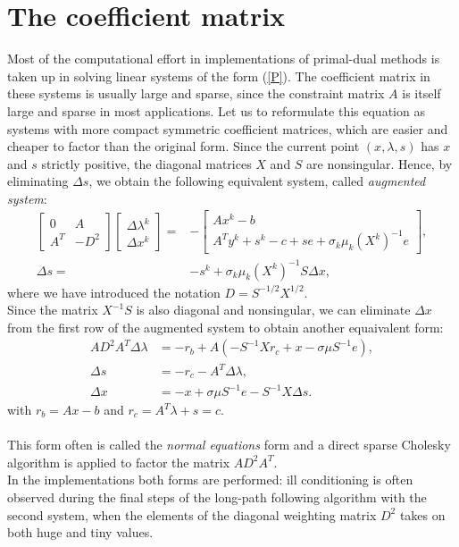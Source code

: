 \documentclass[a4paper,10 pt,titlepage,twoside]{book}
\theoremstyle{plain}
\theoremstyle{definition}
\theoremstyle{remark}
\begin{document}
\section*{The coefficient matrix}
Most of the computational effort in implementations of primal-dual methods is taken up in solving linear systems of the form (\ref{P}). The
coefficient matrix in these systems is usually large and sparse, since the constraint
matrix $A$ is itself large and sparse in most applications. Let us to reformulate
this equation as systems with more compact symmetric coefficient matrices, which
are easier and cheaper to factor than the original form. Since the current point $(x, \lambda, s)$ has $x$ and $s$ strictly
positive, the diagonal matrices $X$ and $S$ are nonsingular. Hence, by eliminating $\Delta s$, we obtain the following equivalent system, called \textit{augmented system}:
\begin{align*}
\begin{bmatrix}
0&A\\A^{T}&-D^{2}
\end{bmatrix}\begin{bmatrix}
\Delta\lambda^{k} \\\Delta x^{k}
\end{bmatrix}=&-\begin{bmatrix}
Ax^{k}-b\\A^{T}y^{k}+s^{k}-c+ se + \sigma_{k}\mu_{k}(X^{k})^{-1}e
\end{bmatrix},\\
\Delta s =& -s^{k} +\sigma_{k}\mu_{k} (X^{k})^{-1}S\Delta x,
\end{align*}
where we have introduced the notation $D = S^{-1/2}X^{1/2}$.\\
Since the matrix $X^{-1}S$ is also diagonal and nonsingular, we can eliminate $\Delta x$ from the first row of the augmented system to obtain another equaivalent form:
\begin{align*}
AD^{2}A^{T}\Delta\lambda &= -r_{b}+A(-S^{-1}Xr_{c}+ x - \sigma\mu S^{-1}e),\\
\Delta s &= -r_{c}-A^{T}\Delta \lambda,\\
\Delta x &= -x + \sigma \mu S^{-1}e-S^{-1}X\Delta s.
\end{align*}
with $r_{b} = Ax - b$ and $r_{c}= A^{T}\lambda +s = c$.\\
\\
This form often is called the \textit{normal equations} form and a direct sparse Cholesky algorithm is applied to factor the matrix $AD^{2}A^{T}$. \\In the implementations both forms are performed: ill conditioning is often observed during the final
steps of the long-path following algorithm with the second system, when the elements of the diagonal weighting
matrix $D^{2}$ takes on both huge and tiny values.
\end{document}
